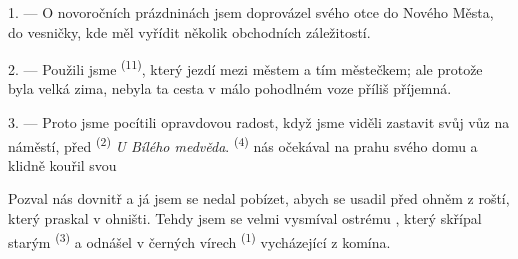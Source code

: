 %
%
%


\VUsaut{4.0mm}
\VUsaut{3.0mm}
\VUfilet{16mm}
\VUsaut{5.6mm}
\VUsaut{3.0mm}

\VUsaut{3.0mm}

\VUsaut{4.0mm}

1. --- O novoročních prázdninách jsem doprovázel svého otce do Nového Města, do
vesničky, kde měl vyřídit několik obchodních záležitostí.

2. --- Použili jsme  \textsuperscript{(11)}, který jezdí mezi městem
a tím městečkem; ale protože byla velká zima, nebyla ta cesta v málo pohodlném voze
příliš příjemná.

3. --- Proto jsme pocítili opravdovou radost, když jsme viděli 
zastavit svůj vůz na náměstí, před  \textsuperscript{(2)} \textit{U
Bílého medvěda}.  \textsuperscript{(4)} nás očekával na prahu svého
domu a klidně kouřil svou 

Pozval nás dovnitř a já jsem se nedal pobízet, abych se usadil před ohněm z roští,
který praskal v ohništi. Tehdy jsem se velmi vysmíval ostrému , který skřípal starým  \textsuperscript{(3)} a odnášel
v černých vírech  \textsuperscript{(1)} vycházející z komína.

